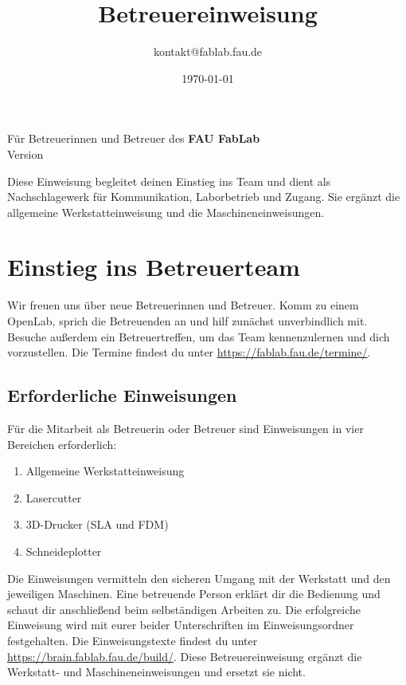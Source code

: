 \documentclass{\basedir/fablab-document}
\date{\today}
\author{kontakt@fablab.fau.de}
\title{Betreuereinweisung}
\begin{document}
\maketitle
\begin{center}
Für Betreuerinnen und Betreuer des \textbf{FAU FabLab}\\[1mm]
{\small Version \Version}
\end{center}

Diese Einweisung begleitet deinen Einstieg ins Team und dient als Nachschlagewerk
für Kommunikation, Laborbetrieb und Zugang. Sie ergänzt die allgemeine Werkstatteinweisung
und die Maschineneinweisungen.

\renewcommand{\contentsname}{Inhaltsverzeichnis / Betreuungsablauf}
\setcounter{tocdepth}{2}
\tableofcontents
\clearpage

\section{Einstieg ins Betreuerteam}
Wir freuen uns über neue Betreuerinnen und Betreuer. Komm zu einem OpenLab, sprich die
Betreuenden an und hilf zunächst unverbindlich mit. Besuche außerdem ein Betreuertreffen,
um das Team kennenzulernen und dich vorzustellen. Die Termine findest du unter
\url{https://fablab.fau.de/termine/}.

\subsection{Erforderliche Einweisungen}
Für die Mitarbeit als Betreuerin oder Betreuer sind Einweisungen in vier Bereichen erforderlich:
\begin{enumerate}
 \item Allgemeine Werkstatteinweisung
 \item Lasercutter
 \item 3D-Drucker (SLA und FDM)
 \item Schneideplotter
\end{enumerate}
Die Einweisungen vermitteln den sicheren Umgang mit der Werkstatt und den jeweiligen Maschinen.
Eine betreuende Person erklärt dir die Bedienung und schaut dir anschließend beim selbständigen
Arbeiten zu. Die erfolgreiche Einweisung wird mit eurer beider Unterschriften im Einweisungsordner
festgehalten. Die Einweisungstexte findest du unter \url{https://brain.fablab.fau.de/build/}.
Diese Betreuereinweisung ergänzt die Werkstatt- und Maschineneinweisungen und ersetzt sie nicht.
\end{document}

